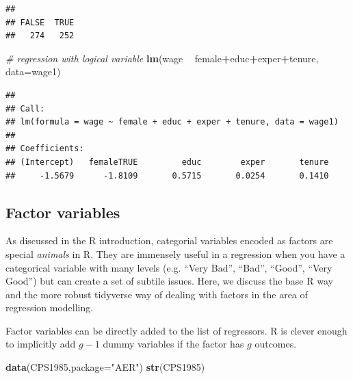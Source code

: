 \documentclass[]{book}
\newenvironment{Shaded}{\begin{snugshade}}{\end{snugshade}}
\newcommand{\CommentTok}[1]{\textcolor[rgb]{0.56,0.35,0.01}{\textit{#1}}}
\newcommand{\DataTypeTok}[1]{\textcolor[rgb]{0.13,0.29,0.53}{#1}}
\newcommand{\KeywordTok}[1]{\textcolor[rgb]{0.13,0.29,0.53}{\textbf{#1}}}
\newcommand{\NormalTok}[1]{#1}
\newcommand{\OperatorTok}[1]{\textcolor[rgb]{0.81,0.36,0.00}{\textbf{#1}}}
\newcommand{\StringTok}[1]{\textcolor[rgb]{0.31,0.60,0.02}{#1}}
\begin{document}
\begin{verbatim}
## 
## FALSE  TRUE 
##   274   252
\end{verbatim}

\begin{Shaded}
\begin{Highlighting}[]
\CommentTok{# regression with logical variable}
\KeywordTok{lm}\NormalTok{(wage }\OperatorTok{~}\StringTok{ }\NormalTok{female}\OperatorTok{+}\NormalTok{educ}\OperatorTok{+}\NormalTok{exper}\OperatorTok{+}\NormalTok{tenure, }\DataTypeTok{data=}\NormalTok{wage1)}
\end{Highlighting}
\end{Shaded}

\begin{verbatim}
## 
## Call:
## lm(formula = wage ~ female + educ + exper + tenure, data = wage1)
## 
## Coefficients:
## (Intercept)   femaleTRUE         educ        exper       tenure  
##     -1.5679      -1.8109       0.5715       0.0254       0.1410
\end{verbatim}

\hypertarget{factor-variables}{%
\subsection{Factor variables}\label{factor-variables}}

As discussed in the R introduction, categorial variables encoded as
factors are special \emph{animals} in R. They are immensely useful in a
regression when you have a categorical variable with many levels (e.g.
``Very Bad'', ``Bad'', ``Good'', ``Very Good'') but can create a set of
subtile issues. Here, we discuss the base R way and the more robust
tidyverse way of dealing with factors in the area of regression
modelling.

Factor variables can be directly added to the list of regressors. R is
clever enough to implicitly add \(g-1\) dummy variables if the factor
has \(g\) outcomes.

\begin{Shaded}
\begin{Highlighting}[]
\KeywordTok{data}\NormalTok{(CPS1985,}\DataTypeTok{package=}\StringTok{"AER"}\NormalTok{)}
\KeywordTok{str}\NormalTok{(CPS1985)}
\end{Highlighting}
\end{Shaded}
\end{document}
